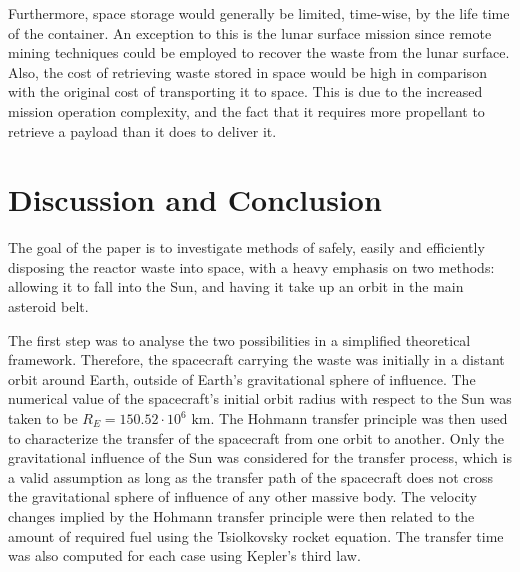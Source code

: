 \documentclass[onecolumn,12pt]{article}
\numberwithin{equation}{section}
\begin{document}
Furthermore, space storage would generally be limited, time-wise, by the life time of the container. An exception to this is the lunar surface mission since remote mining techniques could be employed to recover the waste from the lunar surface. Also, the cost of retrieving waste stored in space would be high in comparison with the original cost of transporting it to space. This is due to the increased mission operation complexity, and the fact that it requires more propellant to retrieve a payload than it does to deliver it.

\section{Discussion and Conclusion}
The goal of the paper is to investigate methods of safely, easily and efficiently disposing the reactor waste into space, with a heavy emphasis on two methods: allowing it to fall into the Sun, and having it take up an orbit in the main asteroid belt. 

The first step was to analyse the two possibilities in a simplified theoretical framework. Therefore, the spacecraft carrying the waste was initially in a distant orbit around Earth, outside of Earth's gravitational sphere of influence. The numerical value of the spacecraft's initial orbit radius with respect to the Sun was taken to be $R_E = 150.52 \cdot10^6 \text{ km}$. The Hohmann transfer principle was then used to characterize the transfer of the spacecraft from one orbit to another. Only the gravitational influence of the Sun was considered for the transfer process, which is a valid assumption as long as the transfer path of the spacecraft does not cross the gravitational sphere of influence of any other massive body. The velocity changes implied by the Hohmann transfer principle were then related to the amount of required fuel using the Tsiolkovsky rocket equation. The transfer time was also computed for each case using Kepler's third law. 
\end{document}
